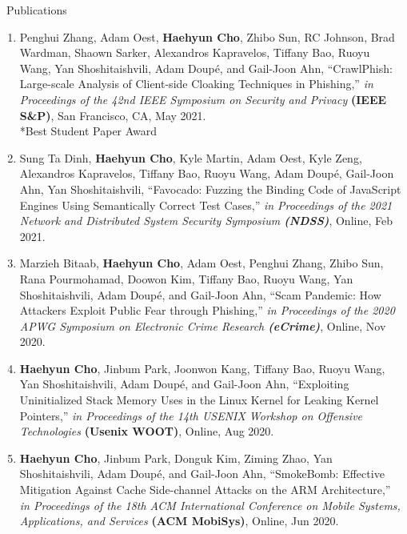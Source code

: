 \documentclass{resume} %
\begin{document}
\begin{rSection}{\faGenderless~Publications}
\begin{enumerate}[leftmargin=0pt]
    	\item Penghui Zhang, Adam Oest, \textbf{Haehyun Cho}, Zhibo Sun, RC Johnson, Brad Wardman, Shaown Sarker, Alexandros Kapravelos, Tiffany Bao, Ruoyu Wang, Yan Shoshitaishvili, Adam Doup\'e, and Gail-Joon Ahn,
    	``CrawlPhish: Large-scale Analysis of Client-side Cloaking Techniques in Phishing,''
        \emph{in Proceedings of the 42nd IEEE Symposium on Security and Privacy} \textbf{(IEEE S\&P)},
    	San Francisco, CA, May 2021.\\
        {*}Best Student Paper Award

    	\item Sung Ta Dinh, \textbf{Haehyun Cho}, Kyle Martin, Adam Oest, Kyle Zeng, Alexandros Kapravelos, Tiffany Bao, Ruoyu Wang, Adam Doup\'e, Gail-Joon Ahn, Yan Shoshitaishvili,
        ``Favocado: Fuzzing the Binding Code of JavaScript Engines Using Semantically Correct Test Cases,''
        \emph{in Proceedings of the 2021 Network and Distributed System Security Symposium \textbf{(NDSS)}},
        Online, Feb 2021.

        \item Marzieh Bitaab, \textbf{Haehyun Cho}, Adam Oest, Penghui Zhang, Zhibo Sun, Rana Pourmohamad, Doowon Kim, Tiffany Bao, Ruoyu Wang, Yan Shoshitaishvili, Adam Doup\'e, and Gail-Joon Ahn,
        ``Scam Pandemic: How Attackers Exploit Public Fear through Phishing,''
        \emph{in Proceedings of the 2020 APWG Symposium on Electronic Crime Research \textbf{(eCrime)}},
        Online, Nov 2020.

        \item \textbf{Haehyun Cho}, Jinbum Park, Joonwon Kang, Tiffany Bao, Ruoyu Wang, Yan Shoshitaishvili, Adam Doup\'e, and Gail-Joon Ahn,
        ``Exploiting Uninitialized Stack Memory Uses in the Linux Kernel for Leaking Kernel Pointers,''
        \emph{in Proceedings of the 14th USENIX Workshop on Offensive Technologies} \textbf{(Usenix WOOT)},
        Online, Aug 2020.

        \item \textbf{Haehyun Cho}, Jinbum Park, Donguk Kim, Ziming Zhao, Yan Shoshitaishvili, Adam Doup\'e, and Gail-Joon Ahn,
		``SmokeBomb: Effective Mitigation Against Cache Side-channel Attacks on the ARM Architecture,'' 
        \emph{in Proceedings of the 18th ACM International Conference on Mobile Systems, Applications, and Services} \textbf{(ACM MobiSys)}, 
		Online, Jun 2020.


\end{enumerate}
\end{rSection}
\end{document}
